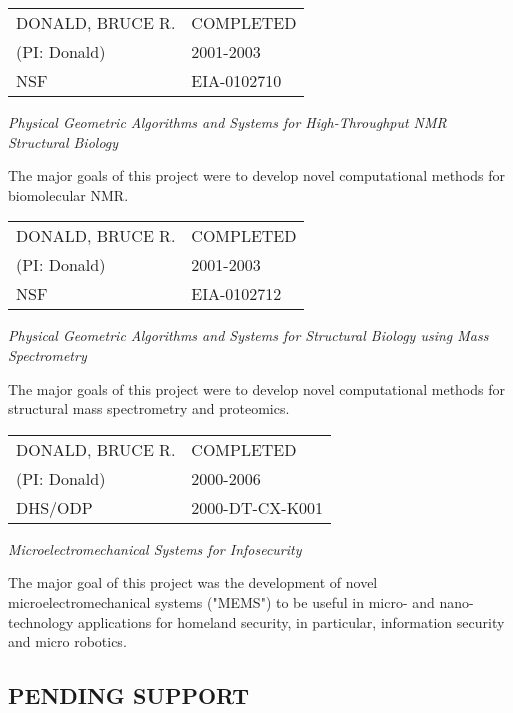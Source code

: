 \documentclass[11pt]{nih}
\begin{document}
\myhrule

\newpage

\myhrule

\noindent
\begin{tabular}{ll}
DONALD, BRUCE R.	&		COMPLETED\\
	(PI: Donald)	&	2001-2003 \\
	NSF	& EIA-0102710\\
\end{tabular}

{\em Physical Geometric Algorithms and Systems for
        High-Throughput NMR Structural Biology}

  The major goals of this project were to
develop novel computational methods for biomolecular NMR.

\myhrule


\noindent
\begin{tabular}{ll}
DONALD, BRUCE R.	&		COMPLETED\\
	(PI: Donald)	&	2001-2003 \\
	NSF	& EIA-0102712\\
\end{tabular}

{\em Physical Geometric Algorithms and Systems for
        Structural Biology using Mass Spectrometry}

The major goals of this project were to
develop novel computational methods for structural mass
spectrometry and proteomics.

\myhrule

\noindent
\begin{tabular}{ll}
DONALD, BRUCE R.	&		COMPLETED\\
	(PI: Donald)	&	2000-2006 \\
	DHS/ODP	& 2000-DT-CX-K001
\end{tabular}

{\em Microelectromechanical Systems for Infosecurity}


The major goal of this project was the development of novel
microelectromechanical systems ("MEMS") to be useful in micro- and
nano-technology applications for homeland security, in particular,
information security and micro robotics.

\myhrule



\subsection*{PENDING SUPPORT}
\end{document}
